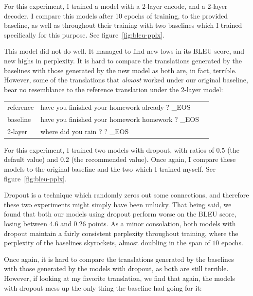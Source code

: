 \documentclass[answers]{exam}
\begin{document}
\begin{CJK}{UTF8}{min}
\begin{questions}
\begin{framed}
  For this experiment, I trained a model with a 2-layer encode, and a 2-layer
  decoder. I compare this models after 10 epochs of training, to the provided
  baseline, as well as throughout their training with two baselines which I
  trained specifically for this purpose. See figure~\ref{fig:bleu-pplx}. 

  This model did not do well. It managed to find new lows in its BLEU score, and
  new highs in perplexity. It is hard to compare the translations generated by
  the baselines with those generated by the new model as both are, in fact,
  terrible. However, some of the translations that \emph{almost} worked under
  our original baseline, bear no resemblance to the reference translation under
  the 2-layer model: 
  
  \begin{tabular}{lll}
    reference & have you finished your homework already ? \_EOS  \\
    baseline  & have you finished your homework homework ? \_EOS \\
    2-layer   & where did you rain ? ? \_EOS
  \end{tabular}
\end{framed}


\begin{framed}
  For this experiment, I trained two models with dropout, with ratios of $0.5$
  (the default value) and $0.2$ (the recommended value).
  Once again, I compare these models to the original baseline and the two which
  I trained myself. See figure~\ref{fig:bleu-pplx}. 
  
  Dropout is a technique which randomly zeros out some connections, and
  therefore these two experiments might simply have been unlucky.
  That being said, we found that both our models using dropout perform worse on
  the BLEU score, losing between $4.6$ and $0.26$ points.
  As a minor consolation, both models with dropout maintain a fairly consistent
  perplexity throughout training, where the perplexity of the baselines
  skyrockets, almost doubling in the span of $10$ epochs.

  Once again, it is hard to compare the translations generated by the baselines
  with those generated by the models with dropout, as both are still terrible.
  However, if looking at my favorite translation, we find that again, the models
  with dropout mess up the only thing the baseline had going for it:
  

\end{framed}
\end{questions}
\end{CJK}
\end{document}
